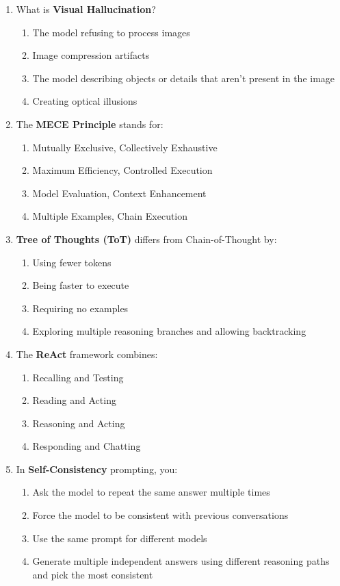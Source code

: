 \documentclass[11pt]{article}
\begin{document}
\begin{enumerate}
\item What is \textbf{Visual Hallucination}?
\begin{enumerate}[label=\Alph*)]
    \item The model refusing to process images
    \item Image compression artifacts
    \item The model describing objects or details that aren't present in the image
    \item Creating optical illusions
\end{enumerate}

\item The \textbf{MECE Principle} stands for:
\begin{enumerate}[label=\Alph*)]
    \item Mutually Exclusive, Collectively Exhaustive
    \item Maximum Efficiency, Controlled Execution
    \item Model Evaluation, Context Enhancement
    \item Multiple Examples, Chain Execution
\end{enumerate}

\item \textbf{Tree of Thoughts (ToT)} differs from Chain-of-Thought by:
\begin{enumerate}[label=\Alph*)]
    \item Using fewer tokens
    \item Being faster to execute
    \item Requiring no examples
    \item Exploring multiple reasoning branches and allowing backtracking
\end{enumerate}

\item The \textbf{ReAct} framework combines:
\begin{enumerate}[label=\Alph*)]
    \item Recalling and Testing
    \item Reading and Acting
    \item Reasoning and Acting
    \item Responding and Chatting
\end{enumerate}

\item In \textbf{Self-Consistency} prompting, you:
\begin{enumerate}[label=\Alph*)]
    \item Ask the model to repeat the same answer multiple times
    \item Force the model to be consistent with previous conversations
    \item Use the same prompt for different models
    \item Generate multiple independent answers using different reasoning paths and pick the most consistent
\end{enumerate}


\end{enumerate}
\end{document}
